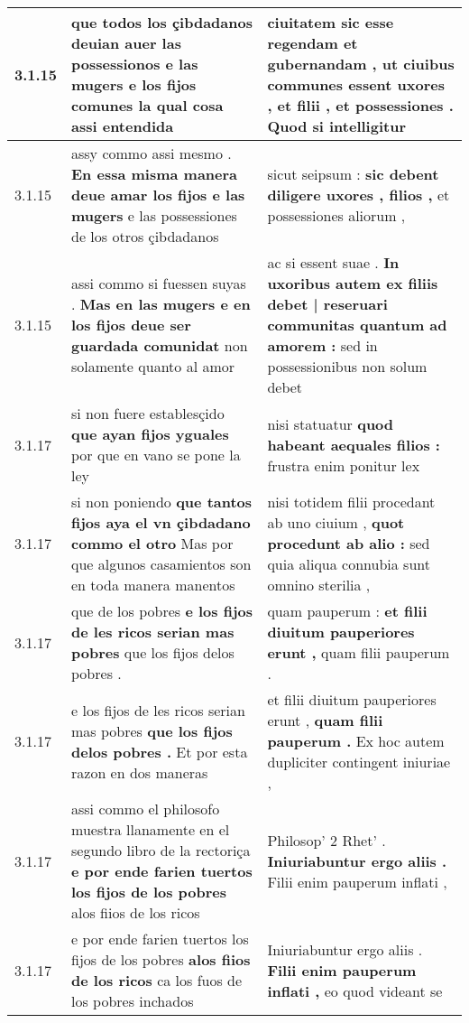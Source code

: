 \begin{tabular}{|p{1cm}|p{6.5cm}|p{6.5cm}|}
3.1.15 & que todos los çibdadanos deuian auer las possessionos e las mugers \textbf{ e los fijos comunes } la qual cosa assi entendida & ciuitatem sic esse regendam et gubernandam , \textbf{ ut ciuibus communes essent uxores , et filii , et possessiones . } Quod si intelligitur \\\hline
3.1.15 & assy commo assi mesmo . \textbf{ En essa misma manera deue amar los fijos e las mugers } e las possessiones de los otros çibdadanos & sicut seipsum : \textbf{ sic debent diligere uxores , filios , } et possessiones aliorum , \\\hline
3.1.15 & assi commo si fuessen suyas . \textbf{ Mas en las mugers e en los fijos deue ser guardada comunidat } non solamente quanto al amor & ac si essent suae . \textbf{ In uxoribus autem ex filiis debet | reseruari communitas quantum ad amorem : } sed in possessionibus non solum debet \\\hline
3.1.17 & si non fuere establesçido \textbf{ que ayan fijos yguales } por que en vano se pone la ley & nisi statuatur \textbf{ quod habeant aequales filios : } frustra enim ponitur lex \\\hline
3.1.17 & si non poniendo \textbf{ que tantos fijos aya el vn çibdadano commo el otro } Mas por que algunos casamientos son en toda manera manentos & nisi totidem filii procedant ab uno ciuium , \textbf{ quot procedunt ab alio : } sed quia aliqua connubia sunt omnino sterilia , \\\hline
3.1.17 & que de los pobres \textbf{ e los fijos de les ricos serian mas pobres } que los fijos delos pobres . & quam pauperum : \textbf{ et filii diuitum pauperiores erunt , } quam filii pauperum . \\\hline
3.1.17 & e los fijos de les ricos serian mas pobres \textbf{ que los fijos delos pobres . } Et por esta razon en dos maneras & et filii diuitum pauperiores erunt , \textbf{ quam filii pauperum . } Ex hoc autem dupliciter contingent iniuriae , \\\hline
3.1.17 & assi commo el philosofo muestra llanamente en el segundo libro de la rectoriça \textbf{ e por ende farien tuertos los fijos de los pobres } alos fiios de los ricos & Philosop’ 2 Rhet’ . \textbf{ Iniuriabuntur ergo aliis . } Filii enim pauperum inflati , \\\hline
3.1.17 & e por ende farien tuertos los fijos de los pobres \textbf{ alos fiios de los ricos } ca los fuos de los pobres inchados & Iniuriabuntur ergo aliis . \textbf{ Filii enim pauperum inflati , } eo quod videant se \\\hline

\end{tabular}
